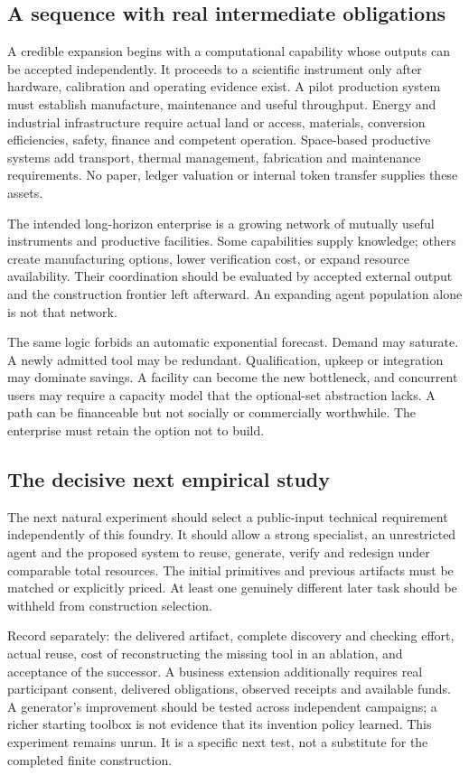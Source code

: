 \documentclass[11pt,letterpaper]{article}
\theoremstyle{definition}\newtheorem{definition}[theorem]{Definition}
\theoremstyle{remark}\newtheorem{remark}[theorem]{Remark}
\begin{document}
\subsection{A sequence with real intermediate obligations}
A credible expansion begins with a computational capability whose outputs can be accepted independently. It proceeds to a scientific instrument only after hardware, calibration and operating evidence exist. A pilot production system must establish manufacture, maintenance and useful throughput. Energy and industrial infrastructure require actual land or access, materials, conversion efficiencies, safety, finance and competent operation. Space-based productive systems add transport, thermal management, fabrication and maintenance requirements. No paper, ledger valuation or internal token transfer supplies these assets.

The intended long-horizon enterprise is a growing network of mutually useful instruments and productive facilities. Some capabilities supply knowledge; others create manufacturing options, lower verification cost, or expand resource availability. Their coordination should be evaluated by accepted external output and the construction frontier left afterward. An expanding agent population alone is not that network.

The same logic forbids an automatic exponential forecast. Demand may saturate. A newly admitted tool may be redundant. Qualification, upkeep or integration may dominate savings. A facility can become the new bottleneck, and concurrent users may require a capacity model that the optional-set abstraction lacks. A path can be financeable but not socially or commercially worthwhile. The enterprise must retain the option not to build.

\subsection{The decisive next empirical study}
The next natural experiment should select a public-input technical requirement independently of this foundry. It should allow a strong specialist, an unrestricted agent and the proposed system to reuse, generate, verify and redesign under comparable total resources. The initial primitives and previous artifacts must be matched or explicitly priced. At least one genuinely different later task should be withheld from construction selection.

Record separately: the delivered artifact, complete discovery and checking effort, actual reuse, cost of reconstructing the missing tool in an ablation, and acceptance of the successor. A business extension additionally requires real participant consent, delivered obligations, observed receipts and available funds. A generator's improvement should be tested across independent campaigns; a richer starting toolbox is not evidence that its invention policy learned. This experiment remains unrun. It is a specific next test, not a substitute for the completed finite construction.
\end{document}
